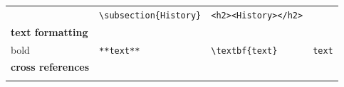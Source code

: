 \documentclass[10pt,fleq]{wlpeerj}
\begin{document}
\begin{longtable}[]{@{}llll@{}}
&
\begin{minipage}[t]{0.26\columnwidth}\raggedright\strut
\texttt{\textbackslash{}subsection\{History\}}\strut
\end{minipage}
&
\begin{minipage}[t]{0.24\columnwidth}\raggedright\strut
\texttt{\textless{}h2\textgreater{}\textless{}History\textgreater{}\textless{}/h2\textgreater{}}\strut
\end{minipage}\tabularnewline
\begin{minipage}[t]{0.24\columnwidth}\raggedright\strut
\textbf{text
formatting}\strut
\end{minipage}
&
\begin{minipage}[t]{0.15\columnwidth}\raggedright\strut
\strut
\end{minipage}
&
\begin{minipage}[t]{0.26\columnwidth}\raggedright\strut
\strut
\end{minipage}
&
\begin{minipage}[t]{0.24\columnwidth}\raggedright\strut
\strut
\end{minipage}\tabularnewline
\begin{minipage}[t]{0.24\columnwidth}\raggedright\strut
bold\strut
\end{minipage}
&
\begin{minipage}[t]{0.15\columnwidth}\raggedright\strut
\texttt{**text**}\strut
\end{minipage}
&
\begin{minipage}[t]{0.26\columnwidth}\raggedright\strut
\texttt{\textbackslash{}textbf\{text\}}\strut
\end{minipage}
&
\begin{minipage}[t]{0.24\columnwidth}\raggedright\strut
\texttt{text}\strut
\end{minipage}\tabularnewline
\begin{minipage}[t]{0.24\columnwidth}\raggedright\strut
\textbf{cross
references}\strut
\end{minipage}
&
\begin{minipage}[t]{0.15\columnwidth}\raggedright\strut
\strut
\end{minipage}
&
\begin{minipage}[t]{0.26\columnwidth}\raggedright\strut
\strut
\end{minipage}
&
\begin{minipage}[t]{0.24\columnwidth}\raggedright\strut
\strut
\end{minipage}\tabularnewline
\begin{minipage}[t]{0.24\columnwidth}\raggedright\strut

\end{minipage}
\end{longtable}
\end{document}
